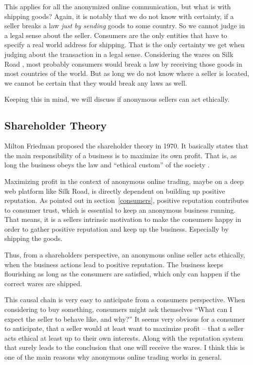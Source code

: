 This applies for all the anonymized online communication, but what is with shipping goods? Again, it is notably that we do not know with certainty, if a seller breaks a law \emph{just by sending} goods to some country. So we cannot judge in a legal sense about the seller. Consumers are the only entities that have to specify a real world address for shipping. That is the only certainty we get when judging about the transaction in a legal sense. Considering the wares on Silk Road \cite{silkroad2013}, most probably consumers would break a law by receiving those goods in most countries of the world. But as long we do not know where a seller is located, we cannot be certain that they would break any laws as well.

Keeping this in mind, we will discuss if anonymous sellers can act ethically.

\subsection{Shareholder Theory}

Milton Friedman proposed the shareholder theory in 1970. It basically states that the main responsibility of a business is to maximize its own profit. That is, as long the business obeys the law and ``ethical custom'' of the society \cite{shareholder}.

Maximizing profit in the context of anonymous online trading, maybe on a deep web platform like Silk Road, is directly dependent on building up positive reputation. As pointed out in section~\ref{consumers}, positive reputation contributes to consumer trust, which is essential to keep an anonymous business running. That means, it is a sellers intrinsic motivation to make the consumers happy in order to gather positive reputation and keep up the business. Especially by shipping the goods.

Thus, from a shareholders perspective, an anonymous online seller acts ethically, when the business actions lead to positive reputation. The business keeps flourishing as long as the consumers are satisfied, which only can happen if the correct wares are shipped.

This causal chain is very easy to anticipate from a consumers perspective. When considering to buy something, consumers might ask themselves ``What can I expect the seller to behave like, and why?'' It seems very obvious for a consumer to anticipate, that a seller would at least want to maximize profit -- that a seller acts ethical at least up to their own interests. Along with the reputation system that surely leads to the conclusion that one will receive the wares. I think this is one of the main reasons why anonymous online trading works in general.


